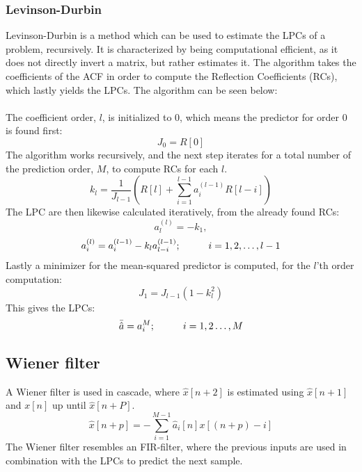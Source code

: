 \subsubsection{Levinson-Durbin}
Levinson-Durbin is a method which can be used to estimate the LPCs of a problem, recursively. It is characterized by being computational efficient, as it does not directly invert a matrix, but rather estimates it.
The algorithm takes the coefficients of the ACF in order to compute the Reflection Coefficients (RCs), which lastly yields the LPCs. The algorithm can be seen below:\\\\
The coefficient order, $l$, is initialized to 0, which means the predictor for order 0 is found first:
\begin{equation}\label{LDInit}
	J_0=R[0]
\end{equation}
The algorithm works recursively, and the next step iterates for a total number of the prediction order, $M$, to compute RCs for each $l$.
\begin{equation}\label{LDStep1}
	k_l=\frac{1}{J_{l-1}} \left ( R[l] + \sum_{i=1}^{l-1} a_i^{(l-1)}R[l-i]   \right) 
\end{equation}
The LPC are then likewise calculated iteratively, from the already found RCs: 
\begin{equation}\label{LDStep2_1}
	a_l^{(l)} = -k_1,
\end{equation}
\begin{equation}\label{LDStep2_2}
a_i^{(l)} = a_i^{(l-1)} - k_l a_{l-i}^{(l-1)} ; \hspace{10mm} i = 1,2,\dotsc,l-1
\end{equation}
Lastly a minimizer for the mean-squared predictor is computed, for the $l$'th order computation:
\begin{equation}\label{LDStep2}
	J_1 = J_{l-1} (1-k_l^2)
\end{equation}
This gives the LPCs:
\begin{equation}
	\bar{\hat{a}} = a_i^{M}; \hspace{10mm} i = 1,2 \dotsc , M
\end{equation}

\subsection{Wiener filter}
A Wiener filter is used in cascade, where $\hat{x}[n+2]$ is estimated using $\hat{x}[n+1]$ and $x[n]$ up until $\hat{x}[n+P]$. 
\begin{equation}\label{eq:AppPredictor}
\hat{x}[n+p] =- \sum^{M-1}_{i=1}\hat{a}_i[n]x[(n+p)-i]
\end{equation}
The Wiener filter resembles an FIR-filter, where the previous inputs are used in combination with the LPCs to predict the next sample. 

